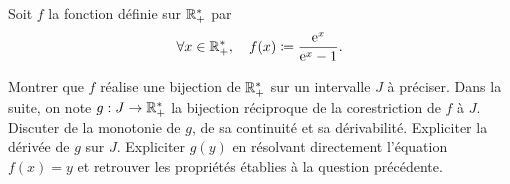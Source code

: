 \documentclass{magnolia}
\begin{document}
















Soit $f$ la fonction définie sur $\mathbb{R}_+^*$ par
\[\forall x\in\mathbb{R}_+^*,\quad f(x)\coloneqq\frac{{\rm e}^x}{{\rm e}^x-1}.\]
\begin{questions}
\question Montrer que $f$ réalise une bijection de $\mathbb{R}_+^*$ sur un intervalle $J$ à préciser.
\enonce Dans la suite, on note $g:J\to\mathbb{R}_+^*$ la bijection réciproque de la corestriction de $f$
  à $J$.
\question Discuter de la monotonie de $g$, de sa continuité et sa dérivabilité. Expliciter
  la dérivée de $g$ sur $J$.
\question Expliciter $g(y)$ en résolvant directement l'équation $f(x)=y$ et retrouver les
  propriétés établies à la question précédente.
\end{questions}
\end{document}
